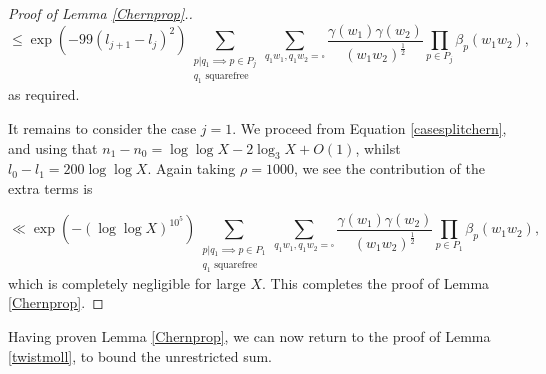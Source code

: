 \documentclass[12pt]{amsart}
\numberwithin{equation}{section}
\numberwithin{thm}{section}
\newcommand{\1}{\mathbf 1}
\begin{document}
\begin{proof}[Proof of Lemma \ref{Chernprop}.]
\begin{equation}\le \exp\left(-99(l_{j+1}-l_{j})^2\right)\sum_{\substack{p|q_1\implies p\in P_{j}\\ q_1\text{  squarefree}}}\sum_{q_1w_1,q_1w_2=\square} \frac{\gamma(w_1)\gamma(w_2)}{(w_1w_2)^{\frac{1}{2}}} \prod_{p\in P_{j}} \beta_p(w_1w_2),\end{equation} as required. 

It remains to consider the case $j=1$. We proceed from Equation \eqref{casesplitchern}, and using that $n_1-n_0=\log\log X-2\log_3 X+O(1)$, whilst $l_0-l_1= 200\log\log X.$ Again  taking $\rho=1000$, we see the contribution of the extra terms is

\begin{equation}
	\ll \exp\left(-(\log\log X)^{10^5}\right)\sum_{\substack{p|q_1\implies p\in P_{1}\\ q_1\text{  squarefree}}}\sum_{q_1w_1,q_1w_2=\square} \frac{\gamma(w_1)\gamma(w_2)}{(w_1w_2)^{\frac{1}{2}}} \prod_{p\in P_{1}} \beta_p(w_1w_2),
\end{equation}  
which is completely negligible for large $X$. This completes the proof of Lemma \ref{Chernprop}.\end{proof}
Having proven Lemma \ref{Chernprop}, we can now return to the proof of Lemma \ref{twistmoll}, to bound the unrestricted sum.
\end{document}
